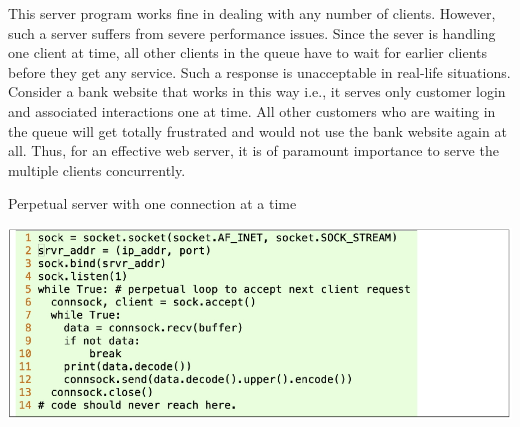 \begin{multicols}{2}
This server program works fine in dealing with any number of clients. However, such a server suffers from severe performance issues. Since the sever is handling one client at time, all other clients in the queue have to wait for earlier clients before they get any service. Such a response is unacceptable in real-life situations. Consider a bank website that works in this way i.e., it serves only customer login and associated interactions one at time. All other customers who are waiting in the queue will get totally frustrated and would not use the bank website again at all. Thus, for an effective web server, it is of paramount importance to serve the multiple clients concurrently.
\end{multicols}

\begin{table}[H]

\vspace{-.6cm}

\centering
\caption{Perpetual server with one connection at a time}\label{tab08}
\includegraphics[scale=2.35]{src/Figures/chap1/tab08.jpg}
\end{table}

